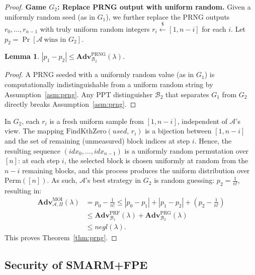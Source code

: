 \documentclass{ieeeaccess}
\newcommand{\rtsmarmtwo}{SMARM+FPE\xspace}
\newtheorem{lemma}{Lemma}[section]
\newcommand{\Adv}{\mathbf{Adv}}
\begin{document}
\begin{proof}
\medskip
\noindent\textbf{Game $G_2$: Replace PRNG output with uniform random.}
Given a uniformly random seed (as in $G_1$), we further replace the PRNG
outputs $r_0,\dots,r_{n-1}$ with truly uniform random integers
$r_i \xleftarrow{\$} [1, n-i]$ for each $i$.
Let $p_2 = \Pr[\mathcal{A}\ \text{wins in } G_2]$.
 
\begin{lemma}
\label{lem:g1-g2}
$|p_1 - p_2| \leq \Adv^{\mathrm{PRNG}}_{\mathcal{B}_2}(\lambda)$.
\end{lemma}
\begin{proof}
A PRNG seeded with a uniformly random value (as in $G_1$) is computationally indistinguishable from a uniform random string by Assumption~\ref{asm:prng}.
Any PPT distinguisher $\mathcal{B}_2$ that separates $G_1$ from $G_2$
directly breaks Assumption~\ref{asm:prng}.
\end{proof}
 
In $G_2$, each $r_i$ is a fresh uniform sample from $[1, n-i]$,
independent of $\mathcal{A}$'s view.
The mapping $\mathrm{FindKthZero}(\mathit{used},\, r_i)$ is a bijection
between $[1, n-i]$ and the set of remaining (unmeasured) block indices at
step $i$.
Hence, the resulting sequence
$(\mathit{idx}_0,\dots,\mathit{idx}_{n-1})$ is a uniformly random
permutation over $[n]$: at each step $i$, the selected block is chosen
uniformly at random from the $n - i$ remaining blocks, and this process
produces the uniform distribution over $\mathrm{Perm}([n])$.
As such, $\mathcal{A}$'s best strategy in $G_2$ is random guessing:
$p_2 = \frac{1}{n!}$, resulting in:
\[
\begin{aligned}
  \Adv^{\mathrm{MOI}}_{\mathcal{A},\Pi}(\lambda)
  &= p_0 - \tfrac{1}{n!}
  \leq |p_0 - p_1| + |p_1 - p_2| + (p_2 - \tfrac{1}{n!})\\
  &\leq \Adv^{\mathrm{PRF}}_{\mathcal{B}_1}(\lambda)
       + \Adv^{\mathrm{PRG}}_{\mathcal{B}_2}(\lambda)\\
  &\leq \mathit{negl}(\lambda).
\end{aligned}
\]
This proves Theorem~\ref{thm:prng}.
 
\end{proof}
 
\subsection{Security of \rtsmarmtwo}
\label{sec:proof-fpe}
 
\end{document}
